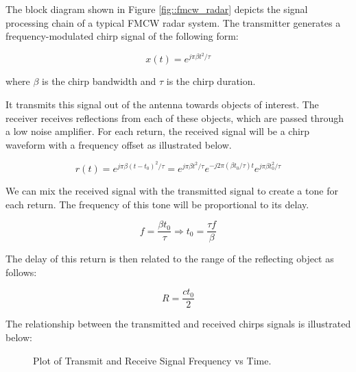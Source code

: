 \documentclass[conference]{IEEEtran}
\begin{document}
 The block diagram shown in Figure \ref{fig::fmcw_radar} depicts the signal processing chain of a typical FMCW radar system. The transmitter generates a frequency-modulated chirp signal of the following form:
 
 	\begin{equation}
 		x(t) = e^{j\pi{\beta}t^2/\tau}
 		\label{eq::chirp}
 	\end{equation}
 	
 	where $\beta$ is the chirp bandwidth and $\tau$ is the chirp duration.
 	
	It transmits this signal out of the antenna towards objects of interest. The receiver receives reflections from each of these objects, which are passed through a low noise amplifier. For each return, the received signal will be a chirp waveform with a frequency offset as illustrated below.
	
	\begin{equation}
		r(t) = e^{j\pi{\beta}(t - t_0)^2/\tau} = e^{j\pi{\beta}t^2/\tau}e^{-j2\pi({\beta}t_0/\tau)t}e^{j\pi{\beta}t_0^2/\tau}
		\label{eq::delayed_chirp}
	\end{equation}
	
	We can mix the received signal with the transmitted signal to create a tone for each return. The frequency of this tone will be proportional to its delay.
	
	\begin{equation}
		f = \frac{{\beta}t_0}{\tau} \Rightarrow t_0 = \frac{{\tau}f}{\beta}
	\end{equation}
	
	The delay of this return is then related to the range of the reflecting object as follows:
	
	\begin{equation}
		R = \frac{ct_0}{2}
	\end{equation}
	
	The relationship between the transmitted and received chirps signals is illustrated below:
	
	\begin{figure}[H]
    		\centering
    		\caption{Plot of Transmit and Receive Signal Frequency vs Time.\cite{Long2019AssistingTV}}
    		\label{fig::fmcw_spectrogram}
	\end{figure}
	
\end{document}
